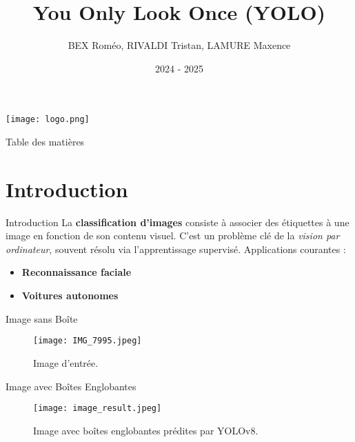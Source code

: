 \documentclass{beamer}
\title{You Only Look Once (YOLO)}
\author{BEX Roméo, RIVALDI Tristan, LAMURE Maxence}
\institute{Université de Montpellier \\
Master 2 Statistiques et Sciences des Données}
\date{2024 - 2025}
\begin{document}
\begin{frame}
    \titlepage
    \begin{center}
        \texttt{[image: logo.png]} %
    \end{center}
\end{frame}


\begin{frame}{Table des matières}
    \tableofcontents
\end{frame}

\section{Introduction}

\begin{frame}{Introduction}
    La \textbf{classification d'images} consiste à associer des étiquettes à une image en fonction de son contenu visuel. C'est un problème clé de la \textit{vision par ordinateur}, souvent résolu via l'apprentissage supervisé. Applications courantes :
    \begin{itemize}
        \item \textbf{Reconnaissance faciale}
        \item \textbf{Voitures autonomes}
    \end{itemize}
\end{frame}



\begin{frame}{Image sans Boîte}
    \begin{figure}
        \centering
        \texttt{[image: IMG\_7995.jpeg]}
        \caption{Image d'entrée.}
    \end{figure}
\end{frame}

\begin{frame}{Image avec Boîtes Englobantes}
    \begin{figure}
        \centering
        \texttt{[image: image\_result.jpeg]}
        \caption{Image avec boîtes englobantes prédites par YOLOv8.}
    \end{figure}
\end{frame}
\end{document}
